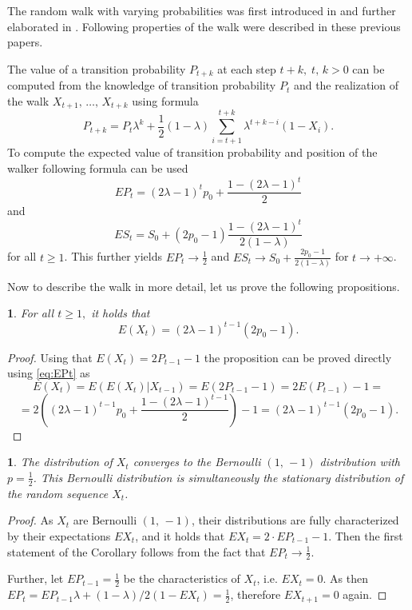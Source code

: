 \documentclass{amsart}
\theoremstyle{definition}
\theoremstyle{plain}
\newtheorem{prop}[thm]{\protect\propositionname}
\theoremstyle{plain}
\newtheorem{cor}[thm]{\protect\corollaryname}
\theoremstyle{plain}
\numberwithin{equation}{section}
\providecommand{\corollaryname}{Corollary}
\providecommand{\propositionname}{Proposition}
\begin{document}
The random walk with varying probabilities was first introduced in
\cite{ja2017ddny} and further elaborated in \cite{ja2019teze}.
Following properties of the walk were described in these previous
papers.

The value of a transition probability $P_{t+k}$ at
each step $t+k,\;t,\,k>0$ can be computed from the knowledge of
transition probability $P_{t}$ and the realization of the walk
$X_{t+1},\,\dots,\,X_{t+k}$ using formula
\begin{equation}
P_{t+k}=P_{t}\lambda^{k}+\frac{1}{2}(1-\lambda)\sum_{i=t+1}^{t+k}\lambda^{t+k-i}(1-X_{i}).\label{eq:Pt}
\end{equation} 
To compute the expected value of transition probability and position of the walker following formula can be used
\begin{equation}
EP_{t}=(2\lambda-1)^{t}p_{0}+\frac{1-(2\lambda-1)^{t}}{2}\label{eq:EPt}
\end{equation}
and
\begin{equation}
ES_{t}=S_{0}+(2p_{0}-1)\frac{1-(2\lambda-1)^{t}}{2(1-\lambda)}\label{eq:ESt}
\end{equation}
 for all $t\geq1$. This further yields $EP_{t}\rightarrow\frac{1}{2}$
and $ES_{t}\rightarrow S_{0}+\frac{2p_{0}-1}{2(1-\lambda)}$ for $t\rightarrow+\infty$.

Now to describe the walk in more detail, let us
prove the following propositions.

\begin{prop}\label{PropEXt-succes}
For all $t\geq1,$ it holds that
\begin{equation}
E(X_{t})=(2\lambda-1)^{t-1}(2p_{0}-1).
\end{equation}
\end{prop}
\begin{proof}
Using that $E(X_{t})=2P_{t-1}-1$ the proposition can be
proved directly using \eqref{eq:EPt} as
\[
E(X_{t})=E(E(X_{t})|X_{t-1})=E(2P_{t-1}-1)=2E(P_{t-1})-1=
\]
\[
=2((2\lambda-1)^{t-1}p_{0}+\frac{1-(2\lambda-1)^{t-1}}{2})-1=(2\lambda-1)^{t-1}(2p_{0}-1).
\]
\end{proof}

\begin{cor}
\label{cor-stac-dist}
The distribution of $X_t$ converges to the Bernoulli $(1,\,-1)$ distribution with
$p=\frac{1}{2}$. This Bernoulli distribution is simultaneously the stationary distribution of the random sequence $X_t$.
\end{cor}

\begin{proof}
As $X_t$ are Bernoulli $(1,\,-1)$, their distributions are fully characterized by their expectations $EX_t$, and it holds that
$EX_t=2\cdot EP_{t-1}-1$. Then the first statement of the Corollary follows from the fact that $EP_t\to \frac{1}{2}.$

Further, let $EP_{t-1}=\frac{1}{2}$ be the characteristics of $X_t$, i.e.
$EX_t=0$. As then
$EP_t=EP_{t-1}\lambda+(1-\lambda)/2(1-EX_t)=\frac{1}{2}$, therefore $EX_{t+1}=0$ again.

\end{proof}
\end{document}
